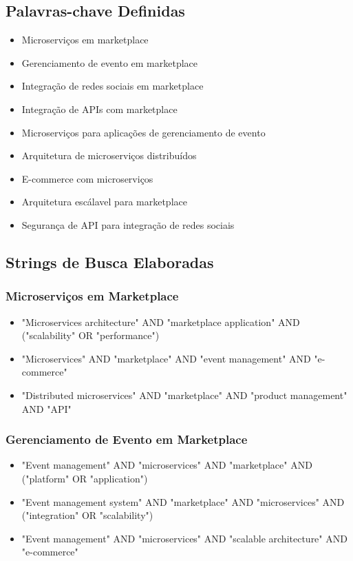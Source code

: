 \documentclass[a4paper,12pt]{article}
\begin{document}
\subsection{Palavras-chave Definidas}
\begin{itemize}
    \item Microserviços em marketplace
    \item Gerenciamento de evento em marketplace
    \item Integração de redes sociais em marketplace
    \item Integração de APIs com marketplace
    \item Microserviços para aplicações de gerenciamento de evento
    \item Arquitetura de microserviços distribuídos
    \item E-commerce com microserviços
    \item Arquitetura escálavel para marketplace
    \item Segurança de API para integração de redes sociais
\end{itemize}

\subsection{Strings de Busca Elaboradas}

\subsubsection{Microserviços em Marketplace}
\begin{itemize}
    \item "Microservices architecture" AND "marketplace application" AND ("scalability" OR "performance")
    \item "Microservices" AND "marketplace" AND "event management" AND "e-commerce"
    \item "Distributed microservices" AND "marketplace" AND "product management" AND "API"
\end{itemize}

\subsubsection{Gerenciamento de Evento em Marketplace}
\begin{itemize}
    \item "Event management" AND "microservices" AND "marketplace" AND ("platform" OR "application")
    \item "Event management system" AND "marketplace" AND "microservices" AND ("integration" OR "scalability")
    \item "Event management" AND "microservices" AND "scalable architecture" AND "e-commerce"
\end{itemize}
\end{document}
